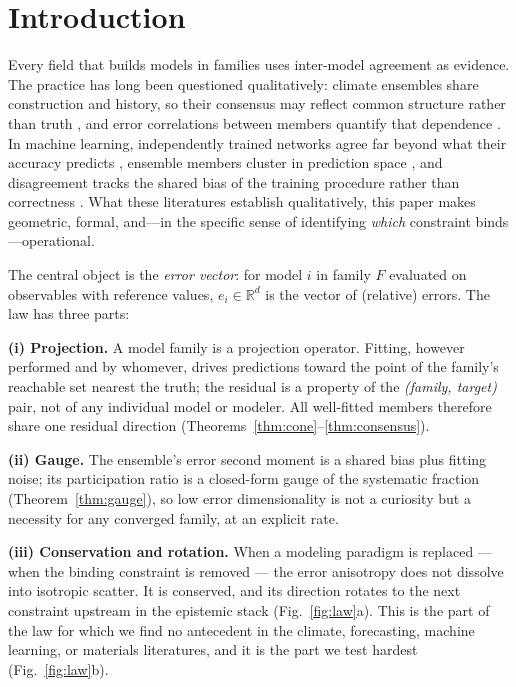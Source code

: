 \documentclass[11pt]{article}
\begin{document}
\section{Introduction}

Every field that builds models in families uses inter-model agreement as
evidence. The practice has long been questioned qualitatively: climate
ensembles share construction and history, so their consensus may reflect
common structure rather than truth \citep{pirtle2010,parker2011}, and
error correlations between members quantify that dependence
\citep{bishop2013,annan2011,knutti2013}. In machine learning, independently
trained networks agree far beyond what their accuracy predicts
\citep{mania2019,geirhos2020}, ensemble members cluster in prediction space
\citep{fort2019}, and disagreement tracks the shared bias of the training
procedure rather than correctness \citep{jiang2021}. What these literatures
establish qualitatively, this paper makes geometric, formal, and---in the
specific sense of identifying \emph{which} constraint binds---operational.

The central object is the \emph{error vector}: for model $i$ in family $F$
evaluated on observables with reference values, $e_i \in \mathbb{R}^d$ is the
vector of (relative) errors. The law has three parts:

\textbf{(i) Projection.} A model family is a projection operator. Fitting,
however performed and by whomever, drives predictions toward the point of the
family's reachable set nearest the truth; the residual is a property of the
\emph{(family, target)} pair, not of any individual model or modeler. All
well-fitted members therefore share one residual direction
(Theorems~\ref{thm:cone}--\ref{thm:consensus}).

\textbf{(ii) Gauge.} The ensemble's error second moment is a shared bias plus
fitting noise; its participation ratio is a closed-form gauge of the
systematic fraction (Theorem~\ref{thm:gauge}), so low error dimensionality is
not a curiosity but a necessity for any converged family, at an explicit rate.

\textbf{(iii) Conservation and rotation.} When a modeling paradigm is replaced
--- when the binding constraint is removed --- the error anisotropy does not
dissolve into isotropic scatter. It is conserved, and its direction rotates to
the next constraint upstream in the epistemic stack
(Fig.~\ref{fig:law}a). This is the part of the law for which we find no
antecedent in the climate, forecasting, machine learning, or materials
literatures, and it is the part we test hardest (Fig.~\ref{fig:law}b).
\end{document}
